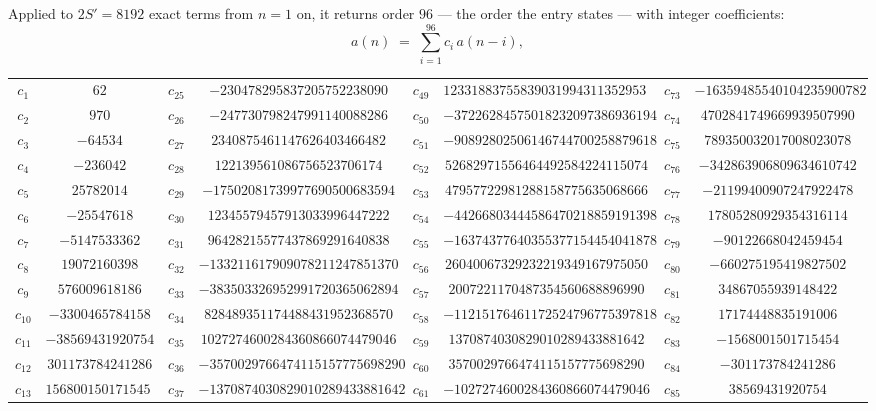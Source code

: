 \documentclass[11pt,a4paper]{article}
\theoremstyle{plain}
\theoremstyle{definition}
\begin{document}
Applied to $2S'=8192$ exact terms from $n=1$ on, it returns order $96$ --- the
order the entry states --- with integer coefficients:
\[
a(n)\;=\;\sum_{i=1}^{96}c_i\,a(n-i),
\]
\begin{center}\small
\begin{tabular}{cccccccc}
$c_{1}$ & $62$ & $c_{25}$ & $-230478295837205752238090$ & $c_{49}$ & $123318837558390319943113529530$ & $c_{73}$ & $-16359485540104235900782$ \\
$c_{2}$ & $970$ & $c_{26}$ & $-247730798247991140088286$ & $c_{50}$ & $-37226284575018232097386936194$ & $c_{74}$ & $4702841749669939507990$ \\
$c_{3}$ & $-64534$ & $c_{27}$ & $2340875461147626403466482$ & $c_{51}$ & $-90892802506146744700258879618$ & $c_{75}$ & $789350032017008023078$ \\
$c_{4}$ & $-236042$ & $c_{28}$ & $122139561086756523706174$ & $c_{52}$ & $52682971556464492584224115074$ & $c_{76}$ & $-342863906809634610742$ \\
$c_{5}$ & $25782014$ & $c_{29}$ & $-17502081739977690500683594$ & $c_{53}$ & $47957722981288158775635068666$ & $c_{77}$ & $-21199400907247922478$ \\
$c_{6}$ & $-25547618$ & $c_{30}$ & $12345579457913033996447222$ & $c_{54}$ & $-44266803444586470218859191398$ & $c_{78}$ & $17805280929354316114$ \\
$c_{7}$ & $-5147533362$ & $c_{31}$ & $96428215577437869291640838$ & $c_{55}$ & $-16374377640355377154454041878$ & $c_{79}$ & $-90122668042459454$ \\
$c_{8}$ & $19072160398$ & $c_{32}$ & $-133211617909078211247851370$ & $c_{56}$ & $26040067329232219349167975050$ & $c_{80}$ & $-660275195419827502$ \\
$c_{9}$ & $576009618186$ & $c_{33}$ & $-383503326952991720365062894$ & $c_{57}$ & $2007221170487354560688896990$ & $c_{81}$ & $34867055939148422$ \\
$c_{10}$ & $-3300465784158$ & $c_{34}$ & $828489351174488431952368570$ & $c_{58}$ & $-11215176461172524796775397818$ & $c_{82}$ & $17174448835191006$ \\
$c_{11}$ & $-38569431920754$ & $c_{35}$ & $1027274600284360866074479046$ & $c_{59}$ & $1370874030829010289433881642$ & $c_{83}$ & $-1568001501715454$ \\
$c_{12}$ & $301173784241286$ & $c_{36}$ & $-3570029766474115157775698290$ & $c_{60}$ & $3570029766474115157775698290$ & $c_{84}$ & $-301173784241286$ \\
$c_{13}$ & $1568001501715454$ & $c_{37}$ & $-1370874030829010289433881642$ & $c_{61}$ & $-1027274600284360866074479046$ & $c_{85}$ & $38569431920754$ \\

\end{tabular}
\end{center}
\end{document}
